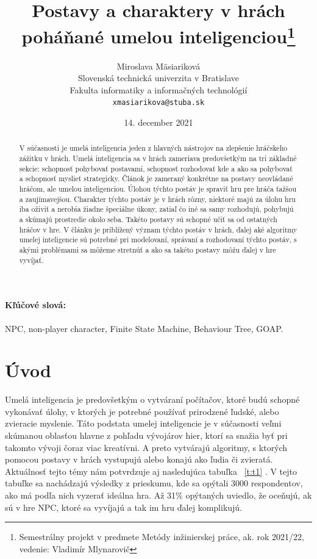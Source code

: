 \documentclass[10pt,twoside,slovak,a4paper]{article}
\title{Postavy a charaktery v hrách poháňané umelou inteligenciou\thanks{Semestrálny projekt v predmete Metódy inžinierskej práce, ak. rok 2021/22, vedenie: Vladimír Mlynarovič}} %
\author{Miroslava Mäsiariková\\[2pt]
	{\small Slovenská technická univerzita v Bratislave}\\
	{\small Fakulta informatiky a informačných technológií}\\
	{\small \texttt{xmasiarikova@stuba.sk}}
	}
\date{\small 14. december 2021} %
\begin{document}
\maketitle

\begin{abstract}

V súčasnosti je umelá inteligencia jeden z hlavných nástrojov na zlepšenie hráčskeho zážitku v hrách. Umelá inteligencia sa v hrách zameriava predovšetkým na tri základné sekcie: schopnosť pohybovať postavami, schopnosť rozhodovať kde a ako sa pohybovať a schopnosť myslieť strategicky. Článok je zameraný  konkrétne na postavy neovládané hráčom, ale umelou inteligenciou. Úlohou týchto postáv je spraviť hru pre hráča ťažšou a zaujímavejšou. Charakter týchto postáv je v hrách rôzny, niektoré majú za úlohu hru iba oživiť a nerobia žiadne špeciálne úkony, zatiaľ čo iné sa samy rozhodujú, pohybujú a skúmajú prostredie okolo seba. Takéto postavy sú schopné učiť sa od ostatných hráčov v hre. V článku je priblížený význam týchto postáv v hrách, ďalej aké algoritmy umelej inteligencie sú potrebné pri modelovaní, správaní a rozhodovaní týchto postáv, s akými problémami sa môžeme stretnúť a ako sa takéto postavy môžu ďalej v hre vyvíjať. 
\end{abstract}

\paragraph{Kľúčové slová:}NPC, non-player character, Finite State Machine, Behaviour Tree, GOAP.

\section{Úvod}

\quad Umelá inteligencia je predovšetkým o vytváraní počítačov, ktoré budú schopné vykonávať úlohy, v ktorých je potrebné používať prirodzené ľudské, alebo zvieracie myslenie. Táto podstata umelej inteligencie je v súčasnosti veľmi skúmanou oblasťou hlavne z pohľadu vývojárov hier, ktorí sa snažia byť pri takomto vývoji čoraz viac kreatívni. A preto vytvárajú algoritmy, s ktorých pomocou postavy v hrách vystupujú alebo konajú ako ľudia či zvieratá. \cite{hernaAI}Aktuálnosť tejto témy nám potvrdzuje aj nasledujúca tabuľka ~\ref{t:t1} . V tejto tabuľke sa nachádzajú výsledky z prieskumu, kde sa opýtali 3000 respondentov, ako má podľa nich vyzerať ideálna hra. Až 31\% opýtaných uviedlo, že oceňujú, ak sú v hre NPC, ktoré sa vyvíjajú a tak im hru ďalej komplikujú. \cite{Types}
\end{document}
